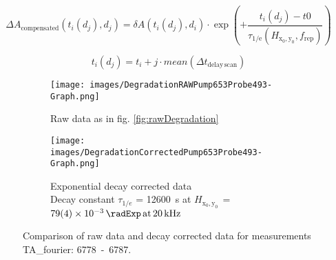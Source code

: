 \documentclass[twoside,openright,listof=numbered]{scrreprt}
\def\pumpExp#1{\ensuremath{\SI{#1}{\radExp}\,\mathrm{at}\, \SI{20}{\kilo\hertz}}}
\def\radiantExp{\ensuremath{H_\mathrm{x_0,y_0}}}
\begin{document}
\begin{equation}\label{eq:degradationCompensation}
\Delta A_\text{compensated}(t_i(d_j), d_j) = \delta A(t_i(d_j), d_i)\cdot \exp\left(+\frac{t_i(d_j)-t0}{\tau_\text{1/e}\left(\radiantExp, f_\text{rep}\right)}\right)
\end{equation}

\begin{equation*}
t_i(d_j) = t_i + j\cdot mean(\Delta t_\mathrm{delay\, scan})
\end{equation*}


\begin{figure}[hbtp]
\centering
\begin{subfigure}[t]{0.4\linewidth}
\centering
\texttt{[image: images/DegradationRAWPump653Probe493-Graph.png]}
\caption{Raw data as in fig. \ref{fig:rawDegradation}}
\end{subfigure}
\hfill
\begin{subfigure}[t]{0.4\linewidth}
\centering
\texttt{[image: images/DegradationCorrectedPump653Probe493-Graph.png]}
\caption{Exponential decay corrected data\\
Decay constant $\tau_{1/e}$ = \SI{12600}{\second} at $\radiantExp\,=\;$\pumpExp{79(4)e-3}}
\end{subfigure}
\caption{Comparison of raw data and decay corrected data for measurements TA\_fourier: \mbox{6778 - 6787}.\label{fig:degradationCorrectionComparison}}
\end{figure}
\end{document}
